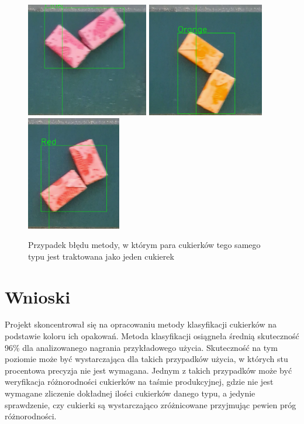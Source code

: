 \documentclass{article}
\begin{document}
\begin{center}
\begin{figure}[H]
\includegraphics[height=5cm]{pink.png}
\includegraphics[height=5cm]{orange.png}
\includegraphics[height=5cm]{red.png}
\caption{Przypadek błędu metody, w którym para cukierków tego samego typu jest traktowana jako jeden cukierek}
\end{figure}
\end{center}

\section{Wnioski}
\label{Wnioski}

Projekt skoncentrował się na opracowaniu metody klasyfikacji cukierków na podstawie koloru ich opakowań. Metoda klasyfikacji osiągneła średnią skuteczność 96\% dla analizowanego nagrania przykładowego użycia. Skuteczność na tym poziomie może być wystarczająca dla takich przypadków użycia, w których stu procentowa precyzja nie jest wymagana. Jednym z takich przypadków może być weryfikacja różnorodności cukierków na taśmie produkcyjnej, gdzie nie jest wymagane zliczenie dokładnej ilości cukierków danego typu, a jedynie sprawdzenie, czy cukierki są wystarczająco zróżnicowane przyjmując pewien próg różnorodności.
\end{document}

